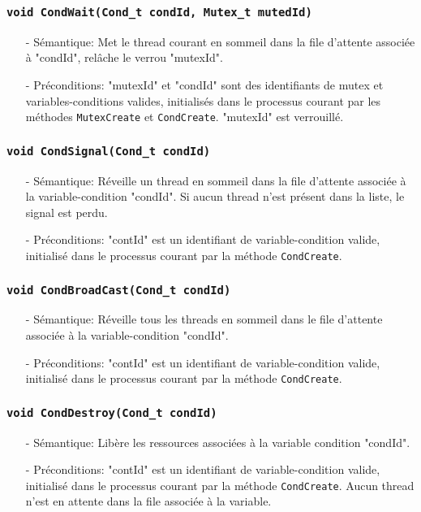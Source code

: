 \documentclass[11pt]{article}
\theoremstyle{definition}
\theoremstyle{definition}
\begin{document}
\subsubsection{\texttt{void CondWait(Cond\_t condId, Mutex\_t mutedId)}}
\begin{itemize}
\item[-]Sémantique: Met le thread courant en sommeil dans la file d'attente associée à "condId",
  relâche le verrou "mutexId".
\item[-]Préconditions: "mutexId" et "condId" sont des identifiants de mutex et variables-conditions
  valides, initialisés dans le processus courant par les méthodes \texttt{MutexCreate} et \texttt{CondCreate}.
  "mutexId" est verrouillé.
\end{itemize}

\subsubsection{\texttt{void CondSignal(Cond\_t condId)}}
\begin{itemize}
\item[-]Sémantique: Réveille un thread en sommeil dans la file d'attente associée à la variable-condition
  "condId". Si aucun thread n'est présent dans la liste, le signal est perdu.
\item[-]Préconditions: "contId" est un identifiant de variable-condition valide, initialisé dans le processus
  courant par la méthode \texttt{CondCreate}.
\end{itemize}

\subsubsection{\texttt{void CondBroadCast(Cond\_t condId)}}
\begin{itemize}
\item[-]Sémantique: Réveille tous les threads en sommeil dans le file d'attente associée à la
  variable-condition "condId".
\item[-]Préconditions: "contId" est un identifiant de variable-condition valide, initialisé dans le processus
  courant par la méthode \texttt{CondCreate}.
\end{itemize}

\subsubsection{\texttt{void CondDestroy(Cond\_t condId)}}
\begin{itemize}
\item[-]Sémantique: Libère les ressources associées à la variable condition "condId". 
\item[-]Préconditions: "contId" est un identifiant de variable-condition valide, initialisé dans le processus
  courant par la méthode \texttt{CondCreate}. Aucun thread n'est en attente dans la file associée à la variable.
\end{itemize}
\end{document}
